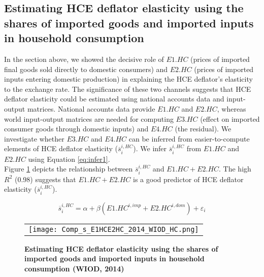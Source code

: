 \documentclass[11pt,a4paper]{paper} %
\begin{document}
\subsection{Estimating HCE deflator elasticity using the shares of imported goods and imported inputs in household consumption}
\label{subsec:estimatingHCEwithnationalaccounts}
In the section above, we showed the decisive role of $E1.HC$ (prices of imported final goods sold directly to domestic consumers) and $E2.HC$ (prices of imported inputs entering domestic production) in explaining the HCE deflator's elasticity to the exchange rate.
The significance of these two channels suggests that HCE deflator elasticity could be estimated using national accounts data and input-output matrices. 
National accounts data provide $E1.HC$ and $E2.HC$, whereas world input-output matrices are needed for computing $E3.HC$ (effect on imported
consumer goods through domestic inputs) and $E4.HC$ (the residual). 
We investigate whether $E3.HC$ and $E4.HC$ can be inferred from easier-to-compute elements of HCE deflator elasticity ($\overline{s}_{i}^{i,HC}$).
%
%
We infer $\overline{s}_{i}^{i,HC}$ from $E1.HC$ and $E2.HC$ using Equation \ref{eq:infer1}.\\
Figure \ref{fig:ratiodir_WIOD} depicts the relationship between $\overline{s}_{i}^{i,HC}$ and $E1.HC+E2.HC$. 
The high $R^2$ (0.98) suggests that $E1.HC+E2.HC$ is a good predictor of HCE deflator elasticity ($\overline{s}_{i}^{i,HC}$). 

 \begin{equation}
\overline{s}_{i}^{i,HC}=\alpha + \beta  \left(E1.HC^{i,imp}+E2.HC^{i,dom}\right) +\varepsilon_i 
\label{eq:infer1}
 \end{equation}
 


\begin{figure}[H]
\centering
\caption{\footnotesize{\textbf{Estimating HCE deflator elasticity using the shares of imported goods and imported inputs in household consumption (WIOD, 2014)}}}
\begin{tabular}{c}
\texttt{[image: Comp\_s\_E1HCE2HC\_2014\_WIOD\_HC.png]}\\
\end{tabular}
\label{fig:ratiodir_WIOD}
\end{figure}
\end{document}
